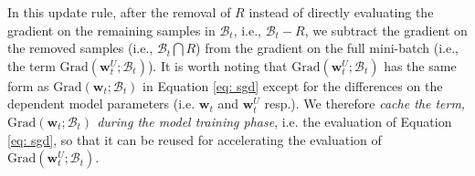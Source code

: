 \documentclass[11pt]{article}
\newcommand{\priu}{PrIU}
\newcommand{\deltagrad}{DeltaGrad}
\newcommand{\uw}{\textbf{w}^{U}}
\newcommand{\w}{\textbf{w}}
\newcommand{\miniB}{\mathscr{B}}
\begin{document}
In this update rule, after the removal of $R$ instead of directly evaluating the gradient on the remaining samples in $\miniB_t$, i.e., $\miniB_t - R$, we subtract the gradient on the removed samples (i.e., $\miniB_t \bigcap R$) from the gradient on the full mini-batch (i.e., the term $\text{Grad}(\uw_t; \miniB_t)$). 
It is worth noting that $\text{Grad}(\uw_t; \miniB_t)$ has the same form as $\text{Grad}(\w_t; \miniB_t)$ in Equation \eqref{eq: sgd} except for the differences on the dependent model parameters (i.e. $\w_t$ and $\uw_t$ resp.). We therefore 
\emph{cache the term, $\text{Grad}(\w_t; \miniB_t)$ during the model training phase}, i.e. the evaluation of Equation \eqref{eq: sgd}, so that it can be reused for accelerating the evaluation of $\text{Grad}(\uw_t; \miniB_t)$.
\end{document}
